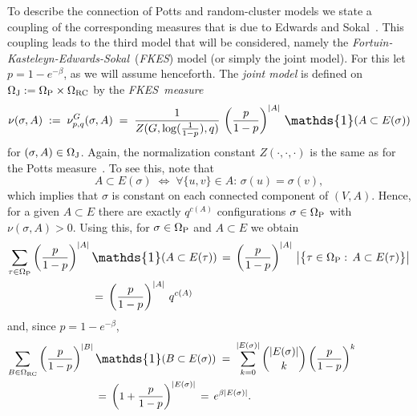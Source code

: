 \documentclass{dis}
\theoremstyle{citing}
\begin{document}
To describe the connection of Potts and random-cluster models 
we state a coupling of the corresponding measures that is 
due to Edwards and Sokal~\cite{ES}. This coupling leads to 
the third model that will be considered, namely the 
{\it {Fortuin-Kasteleyn-Edwards-Sokal}}\ ({\it {FKES}}) model (or simply the 
joint model). 
For this let $p=1-e^{-\beta}$, as we will assume henceforth.
The \emph{joint model}
is defined on ${\Omega}_{\rm J}:={\Omega}_{\rm P}\times{\Omega}_{\rm RC}$ by the 
\emph{{FKES}\ measure}
\vspace{1mm}
\begin{equation} \label{eq:joint}
\nu(\sigma,A)\;:=\;\nu_{p,q}^G(\sigma,A)
	\;=\;\frac{1}{Z(G,\log(\frac1{1-p}),q)}\,
	\left(\frac{p}{1-p}\right)^{{\left\vert {A} \right\vert}}\,{\scalebox{1.2}{\raisebox{-0.2mm}{$\mathds{1}$}}}(A\subset E(\sigma))
\end{equation}
for $(\sigma,A)\in{\Omega}_{\rm J}$. 
Again, the normalization constant $Z(\cdot,\cdot,\cdot)$ is the 
same as for the Potts measure~\cite[Thm.~1.10]{G1}.
To see this, note that 
\[
A\subset E(\sigma) \;\iff\; \forall 
\{u,v\}\in A:\, \sigma(u) = \sigma(v),
\]
which implies that $\sigma$ is constant on each 
connected component of $(V,A)$. Hence, for a given $A\subset E$ 
there are exactly $q^{c(A)}$ configurations $\sigma\in{\Omega}_{\rm P}$ 
with $\nu(\sigma,A)>0$. Using this, for $\sigma\in{\Omega}_{\rm P}$ 
and $A\subset E$ we obtain
\begin{equation}\label{eq:FKSW-RC}
\begin{split}
\sum_{\tau\in{\Omega}_{\rm P}} 
	\left(\frac{p}{1-p}\right)^{{\left\vert {A} \right\vert}}\,&{\scalebox{1.2}{\raisebox{-0.2mm}{$\mathds{1}$}}}(A\subset E(\tau)) 
\,=\, \left(\frac{p}{1-p}\right)^{{\left\vert {A} \right\vert}}\,
	
	{\left\vert {\bigl\{\tau\in{\Omega}_{\rm P}:\, A\subset E(\tau)\bigr\}} \right\vert} \\
&=\, \left(\frac{p}{1-p}\right)^{{\left\vert {A} \right\vert}}\,	q^{c(A)}
\end{split}\end{equation}
and, since $p=1-e^{-\beta}$,
\begin{equation}\label{eq:FKSW-P}
\begin{split}
\sum_{B\in{\Omega}_{\rm RC}} 
	\left(\frac{p}{1-p}\right)^{{\left\vert {B} \right\vert}}\,&{\scalebox{1.2}{\raisebox{-0.2mm}{$\mathds{1}$}}}(B\subset E(\sigma)) 
\;=\; \sum_{k=0}^{{\left\vert {E(\sigma)} \right\vert}} 
	\genfrac(){0pt}{}{{\left\vert {E(\sigma)} \right\vert}}{k}
	\left(\frac{p}{1-p}\right)^{k} \hspace*{1.8cm} \\
&=\, \left(1+\frac{p}{1-p}\right)^{{\left\vert {E(\sigma)} \right\vert}} 
\,=\, e^{\beta {\left\vert {E(\sigma)} \right\vert}}.
\end{split}\end{equation}
\end{document}
